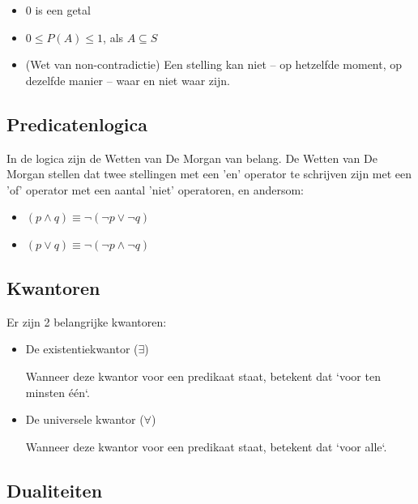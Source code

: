 \documentclass{article}
\begin{document}
		\begin{itemize}
			\item 0 is een getal
			\item \( 0 \leq P(A) \leq 1 \), als \( A \subseteq S \)
			\item (Wet van non-contradictie) Een stelling kan niet -- op hetzelfde moment, op dezelfde manier -- waar en niet waar zijn.
		\end{itemize}
		
		\subsection{Predicatenlogica}
		
		In de logica zijn de Wetten van De Morgan van belang. De Wetten van De Morgan stellen dat twee stellingen met een 'en' operator te schrijven zijn met een 'of' operator met een aantal 'niet' operatoren, en andersom:
	
		\begin{itemize}
			\item \( (p \land q) \equiv \neg(\neg p \lor \neg q) \)
			\item \( (p \lor q) \equiv \neg(\neg p \land \neg q) \)
		\end{itemize}
		
		\subsection{Kwantoren}
		
		Er zijn 2 belangrijke kwantoren:

		\begin{itemize}
			\item De existentiekwantor (\( \exists \))

			Wanneer deze kwantor voor een predikaat staat, betekent dat `voor ten minsten één`.

			\item De universele kwantor (\( \forall \))

			Wanneer deze kwantor voor een predikaat staat, betekent dat `voor alle`.
		\end{itemize}

		
		\subsection{Dualiteiten}
		
\end{document}
